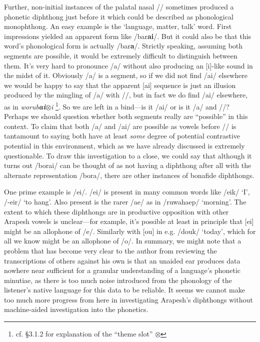 \documentclass[pdftex,12pt,letterpaper]{article}
\let\ipa\textipa
\let\enya\textltailn
\begin{document}
Further, non-initial instances of the palatal nasal /\ipa{\textltailn}/ sometimes produced a phonetic diphthong just before it which could be described as phonological monophthong. An easy example is the `language, matter, talk' word. First impressions yielded an apparent form like /bar\textbf{ai\ipa{\textltailn}}/. But it could also be that this word's phonological form is actually /bar\textbf{a\ipa{\textltailn}}/. Strictly speaking, assuming both segments are possible, it would be extremely difficult to distinguish between them. It's very hard to pronounce /a\ipa{\textltailn}/ without also producing an [i]-like sound in the midst of it. Obviously /a/ is a segment, so if we did not find /ai/ elsewhere we would be happy to say that the apparent [ai] sequence is just an illusion produced by the mingling of /a/ with /\ipa{\textltailn}/, but in fact we do find /ai/ elsewhere, as in \emph{worub\textbf{ai}$\otimes$i} \footnote{cf. \S 3.1.2 for explanation of the ``theme slot'' $\otimes$}. So we are left in a bind---is it /ai/ or is it /a/ and /\ipa{\textltailn}/? Perhaps we should question whether both segments really are ``possible'' in this context. To claim that both /a/ and /ai/ are possible as vowels before /\ipa{\textltailn}/ is tantamount to saying both have at least \emph{some} degree of potential contrastive potential in this environment, which as we have already discussed is extremely questionable. To draw this investigation to a close, we could say that although it turns out /borai\ipa{\enya}/ can be thought of as not having a diphthong after all with the alternate representation /bora\ipa{\enya}/, there are other instances of bonafide diphthongs.
 
One prime example is /ei/. /ei/ is present in many common words like /eik/ `I', /-eir/ `to hang'. Also present is the rarer /ae/ as in /ruwahaep/ `morning'. The extent to which these diphthongs are in productive opposition with other Arapesh vowels is unclear---for example, it's possible at least in principle that [ei] might be an allophone of /e/. Similarly with [ou] in e.g. /douk/ `today', which for all we know might be an allophone of /o/. In summary, we might note that a problem that has become very clear to the author from reviewing the transcriptions of others against his own is that an unaided ear produces data nowhere near sufficient for a granular understanding of a language's phonetic minutiae, as there is too much noise introduced from the phonology of the listener's native language for this data to be reliable. It seems we cannot make too much more progress from here in investigating Arapesh's diphthongs without machine-aided investigation into the phonetics.
\end{document}
